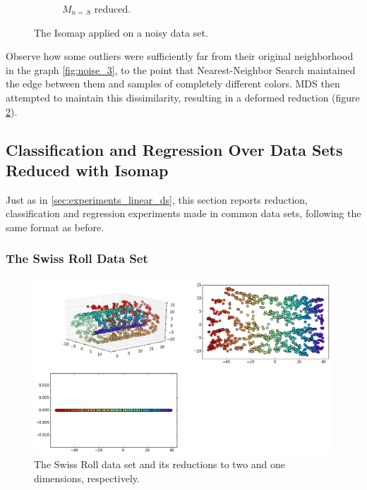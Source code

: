 \documentclass[12pt]{article}
\begin{document}
\begin{description}
\begin{figure}[H]
\begin{subfigure}{.6\linewidth}
			\captionsetup{justification=centering}
			\caption{$M_{n=.8}$ reduced.}
			\label{fig:noise_2}
		\end{subfigure}
		\captionsetup{justification=centering}
		\caption{The Isomap applied on a noisy data set.}
	\end{figure}
	
	Observe how some outliers were sufficiently far from their original neighborhood in the graph \ref{fig:noise_3}, to the point that Nearest-Neighbor Search maintained the edge between them and samples of completely different colors. MDS then attempted to maintain this dissimilarity, resulting in a deformed reduction (figure \ref{fig:noise_2}).
\end{description}

\newpage
\subsection{Classification and Regression Over Data Sets Reduced with Isomap}

Just as in \ref{sec:experiments_linear_ds}, this section reports reduction, classification and regression experiments made in common data sets, following the same format as before.

\subsubsection{The Swiss Roll Data Set}

\begin{figure}[H]
	\centering
	\includegraphics[width=\linewidth]{experiments/2_2_swiss_isomap}
	\captionsetup{justification=centering}
	\caption{The Swiss Roll data set and its reductions to two and one dimensions, respectively.}
\end{figure}
\end{document}
